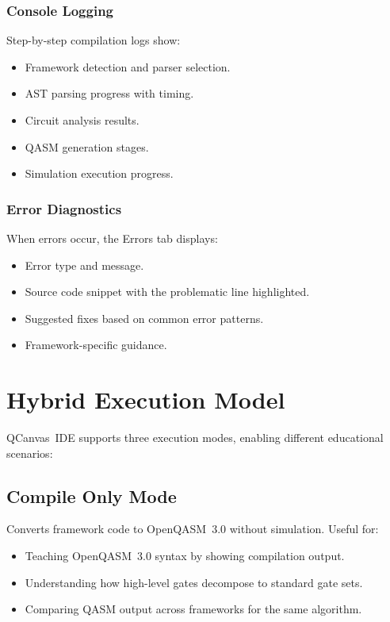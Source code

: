 \documentclass[conference]{IEEEtran}
\begin{document}
\subsubsection{Console Logging}
Step-by-step compilation logs show:
\begin{itemize}
    \item Framework detection and parser selection.
    \item AST parsing progress with timing.
    \item Circuit analysis results.
    \item QASM generation stages.
    \item Simulation execution progress.
\end{itemize}

\subsubsection{Error Diagnostics}
When errors occur, the Errors tab displays:
\begin{itemize}
    \item Error type and message.
    \item Source code snippet with the problematic line highlighted.
    \item Suggested fixes based on common error patterns.
    \item Framework-specific guidance.
\end{itemize}

\section{Hybrid Execution Model}
\label{sec:execution}

QCanvas~IDE supports three execution modes, enabling different educational scenarios:

\subsection{Compile Only Mode}
Converts framework code to OpenQASM~3.0 without simulation. Useful for:
\begin{itemize}
    \item Teaching OpenQASM~3.0 syntax by showing compilation output.
    \item Understanding how high-level gates decompose to standard gate sets.
    \item Comparing QASM output across frameworks for the same algorithm.
\end{itemize}
\end{document}
